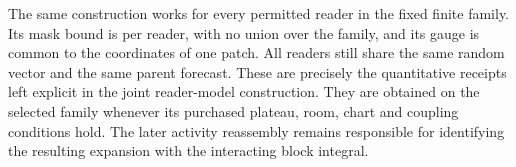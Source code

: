 The same construction works for every permitted reader in the
fixed finite family. Its mask bound is per reader, with no union
over the family, and its gauge is common to the coordinates of
one patch. All readers still share the same random vector and
the same parent forecast. These are precisely the quantitative
receipts left explicit in the joint reader-model construction.
They are obtained on the selected family whenever its purchased
plateau, room, chart and coupling conditions hold. The later
activity reassembly remains responsible for identifying the
resulting expansion with the interacting block integral.
